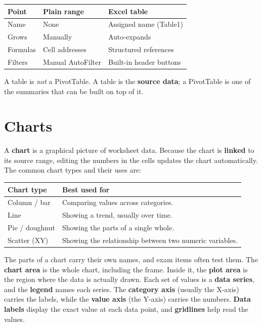 \documentclass[11pt]{article}
\begin{document}
\begin{center}
\begin{tabular}{lll}
\toprule
\textbf{Point} & \textbf{Plain range} & \textbf{Excel table} \\
\midrule
Name & None & Assigned name (Table1) \\
Grows & Manually & Auto-expands \\
Formulas & Cell addresses & Structured references \\
Filters & Manual AutoFilter & Built-in header buttons \\
\bottomrule
\end{tabular}
\end{center}

A table is \emph{not} a PivotTable. A table is the \textbf{source data}; a
PivotTable is one of the summaries that can be built on top of it.

\section{Charts}
A \textbf{chart} is a graphical picture of worksheet data. Because the chart is
\textbf{linked} to its source range, editing the numbers in the cells updates
the chart automatically. The common chart types and their uses are:

\begin{center}
\begin{tabular}{p{}p{}}
\toprule
\textbf{Chart type} & \textbf{Best used for} \\
\midrule
Column / bar & Comparing values across categories. \\
Line & Showing a trend, usually over time. \\
Pie / doughnut & Showing the parts of a single whole. \\
Scatter (XY) & Showing the relationship between two numeric variables. \\
\bottomrule
\end{tabular}
\end{center}

The parts of a chart carry their own names, and exam items often test them. The
\textbf{chart area} is the whole chart, including the frame. Inside it, the
\textbf{plot area} is the region where the data is actually drawn. Each set of
values is a \textbf{data series}, and the \textbf{legend} names each series. The
\textbf{category axis} (usually the X-axis) carries the labels, while the
\textbf{value axis} (the Y-axis) carries the numbers. \textbf{Data labels}
display the exact value at each data point, and \textbf{gridlines} help read the
values.
\end{document}
